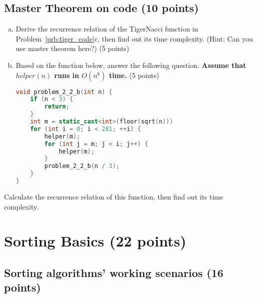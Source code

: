 \documentclass[11pt]{exam}
\begin{document}
\subsection{Master Theorem on code (10 points)}
\begin{enumerate}[(a)]

    \item
          Derive the recurrence relation of the TigerNacci function in Problem~\ref{prb:tiger_code}c, then find out its time complexity.
          (Hint: Can you use master theorem here?) (5 points)
          \begin{solution}
          \end{solution}

    \item
          Based on the function below, answer the following question. \textbf{Assume that $helper(n)$ runs in $O(n^6)$ time.} (5 points)
          \begin{lstlisting}[language=c++]
void problem_2_2_b(int n) {
	if (n < 3) {
		return;
	}
	int m = static_cast<int>(floor(sqrt(n)))
	for (int i = 0; i < 281; ++i) {
		helper(m);
		for (int j = m; j < i; j++) {
			helper(m);
		}
		problem_2_2_b(n / 3);
	}
}
\end{lstlisting}
\end{enumerate}
Calculate the recurrence relation of this function, then find out its time complexity.
\begin{solution}
\end{solution}


\section{Sorting Basics (22 points)}

\subsection{Sorting algorithms' working scenarios (16 points)}
\end{document}
